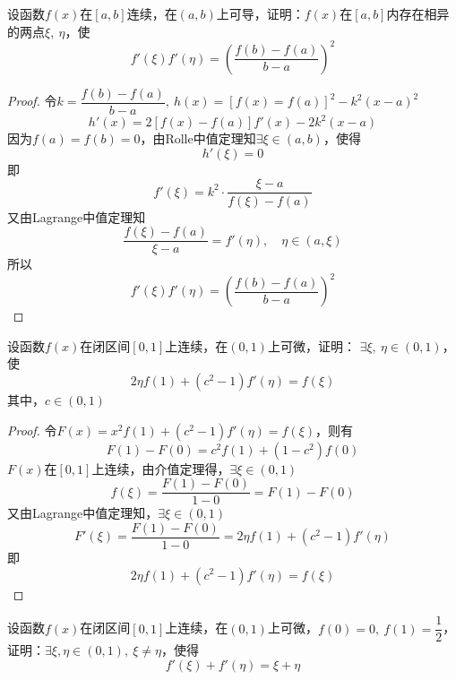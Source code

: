 \begin{proposition}
    
    设函数$f(x)$在$[a,b]$连续，在$(a,b)$上可导，证明：$f(x)$在$[a,b]$内存在相异的两点$\xi,\ \eta$，使
    $$f'(\xi)f'(\eta) = \left( \dfrac{f(b) - f(a)}{b-a} \right)^2$$

\end{proposition}

\begin{proof}

    令$k = \dfrac{f(b) - f(a)}{b-a},\ h(x) = [f(x) = f(a)]^2 - k^2(x-a)^2$
    $$h'(x) = 2[f(x) - f(a)]f'(x) - 2k^2 (x-a)$$
    因为$f(a) = f(b) = 0$，由\textup{Rolle}中值定理知$\exists \xi \in (a,b)$，使得
    $$h'(\xi) = 0$$
    即
    $$f'(\xi) = k^2 \cdot \dfrac{\xi - a}{f(\xi) - f(a)}$$
    又由\textup{Lagrange}中值定理知
    $$\dfrac{f(\xi) - f(a)}{\xi - a} = f'(\eta), \quad \eta \in (a,\xi)$$
    所以
    $$f'(\xi)f'(\eta) = \left( \dfrac{f(b) - f(a)}{b-a} \right)^2$$

\end{proof}

\begin{proposition}
    
    设函数$f(x)$在闭区间$[0,1]$上连续，在$(0,1)$上可微，证明：
    $\exists \xi,\  \eta \in (0,1)$，使
    $$2\eta f(1) + (c^2 - 1)f'(\eta) = f(\xi)$$
    其中，$c \in (0,1)$
    
\end{proposition}

\begin{proof}

    令$F(x) = x^2f(1) + (c^2 - 1)f'(\eta) = f(\xi)$，则有
    $$F(1) - F(0) = c^2f(1) + (1 - c^2)f(0)$$
    $F(x)$在$[0,1]$上连续，由介值定理得，$\exists \xi \in (0,1)$
    $$f(\xi) = \dfrac{F(1) - F(0)}{1 - 0} = F(1) - F(0)$$
    又由\textup{Lagrange}中值定理知，$\exists \xi \in (0,1)$
    $$F'(\xi) = \dfrac{F(1) - F(0)}{1 - 0} = 2\eta f(1) + (c^2 - 1)f'(\eta) $$
    即
    $$2\eta f(1) + (c^2 - 1)f'(\eta) = f(\xi)$$

\end{proof}

\begin{proposition}

    设函数$f(x)$在闭区间$[0,1]$上连续，在$(0,1)$上可微，$f(0) = 0,\ f(1) = \dfrac{1}{2}$，证明：$\exists \xi,\eta \in (0,1),\ \xi \neq \eta$，使得
    $$f'(\xi) + f'(\eta) = \xi + \eta$$

\end{proposition}

